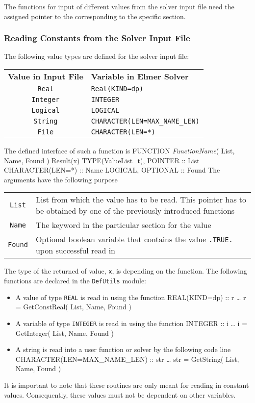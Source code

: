 The functions for input of different values from the solver input file  need the assigned pointer to the corresponding to the specific section.
\subsubsection{Reading Constants from the Solver Input File}
The following value types are defined for the solver input file:
\begin{center}
\begin{tabular}{c p{}}
\textbf{Value in Input File} & \textbf{Variable in Elmer Solver}\\[2ex]
\texttt{Real} & \texttt{Real(KIND=dp)}\\
\texttt{Integer} & \texttt{INTEGER}\\
\texttt{Logical} & \texttt{LOGICAL}\\
\texttt{String} & \texttt{CHARACTER(LEN=MAX\_NAME\_LEN)}\\
\texttt{File} & \texttt{CHARACTER(LEN=*)}\\
\end{tabular}
\end{center}
The defined interface of such a function is
\ttbegin
FUNCTION \textit{FunctionName}( List, Name, Found ) Result(x)
   TYPE(ValueList_t), POINTER :: List
   CHARACTER(LEN=*) :: Name
   LOGICAL, OPTIONAL :: Found
\ttend
The arguments have the following purpose
\begin{center}
\begin{tabular}{c p{}}
\texttt{List} & List from which the value has to be read. This pointer has to be obtained by one of the previously introduced functions\\
\texttt{Name} & The keyword in the particular section for the value\\
\texttt{Found} & Optional boolean variable that contains the value \texttt{.TRUE.} upon successful read in
\end{tabular}
\end{center}
The type of the returned of value, \texttt{x}, is depending on the function.
The following functions are declared in the \texttt{DefUtils} module:
\begin{itemize}
\item A value of type \texttt{REAL} is read in using the function
\ttbegin
REAL(KIND=dp) :: r
\ldots
r = GetConstReal( List, Name, Found )
\ttend

\item A variable of type \texttt{INTEGER} is read in using the function
\ttbegin
INTEGER :: i
\ldots
i = GetInteger( List, Name, Found )
\ttend

\item A string is read into a user function or solver by the following code line
\ttbegin
CHARACTER(LEN=MAX_NAME_LEN) :: str
\ldots
str = GetString( List, Name, Found )
\ttend
\end{itemize}
It is important to note that these routines are only meant for reading in constant values. Consequently, these values must not be dependent on other variables.
